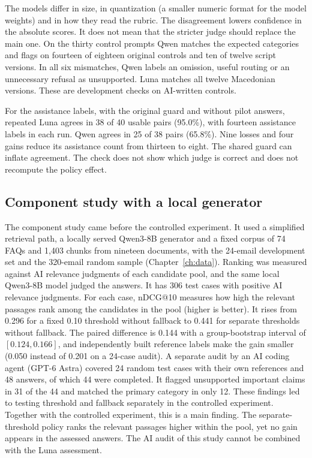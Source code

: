 The models differ in size, in quantization (a smaller numeric format for the model weights) and in how they read the rubric. The disagreement lowers confidence in the absolute scores. It does not mean that the stricter judge should replace the main one. On the thirty control prompts Qwen matches the expected categories and flags on fourteen of eighteen original controls and ten of twelve script versions. In all six mismatches, Qwen labels an omission, useful routing or an unnecessary refusal as unsupported. Luna matches all twelve Macedonian versions. These are development checks on AI-written controls.

For the assistance labels, with the original guard and without pilot answers, repeated Luna agrees in 38 of 40 usable pairs (95.0\%), with fourteen assistance labels in each run. Qwen agrees in 25 of 38 pairs (65.8\%). Nine losses and four gains reduce its assistance count from thirteen to eight. The shared guard can inflate agreement. The check does not show which judge is correct and does not recompute the policy effect.

\subsection{Component study with a local generator}
\label{sec:component-study}

The component study came before the controlled experiment. It used a simplified retrieval path, a locally served Qwen3-8B generator and a fixed corpus of 74 FAQs and 1,403 chunks from nineteen documents, with the 24-email development set and the 320-email random sample (Chapter~\ref{ch:data}). Ranking was measured against AI relevance judgments of each candidate pool, and the same local Qwen3-8B model judged the answers. It has 306 test cases with positive AI relevance judgments. For each case, nDCG@10 measures how high the relevant passages rank among the candidates in the pool (higher is better). It rises from 0.296 for a fixed 0.10 threshold without fallback to 0.441 for separate thresholds without fallback. The paired difference is 0.144 with a group-bootstrap interval of $[0.124,0.166]$, and independently built reference labels make the gain smaller (0.050 instead of 0.201 on a 24-case audit). A separate audit by an AI coding agent (GPT-6 Astra) covered 24 random test cases with their own references and 48 answers, of which 44 were completed. It flagged unsupported important claims in 31 of the 44 and matched the primary category in only 12. These findings led to testing threshold and fallback separately in the controlled experiment. Together with the controlled experiment, this is a main finding. The separate-threshold policy ranks the relevant passages higher within the pool, yet no gain appears in the assessed answers. The AI audit of this study cannot be combined with the Luna assessment.


